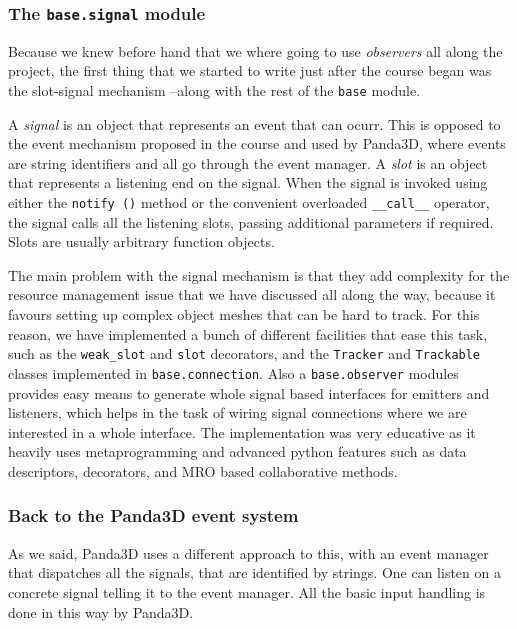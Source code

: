 \documentclass[a4paper,10pt]{article}
\begin{document}
\subsubsection{The \texttt{base.signal} module}

Because we knew before hand that we where going to use
\emph{observers} all along the project, the first thing that we
started to write just after the course began was the slot-signal
mechanism --along with the rest of the \texttt{base} module.

A \emph{signal} is an object that represents an event that can
ocurr. This is opposed to the event mechanism proposed in the course
and used by Panda3D, where events are string identifiers and all go
through the event manager. A \emph{slot} is an object that represents
a listening end on the signal. When the signal is invoked using either
the \texttt{notify ()} method or the convenient overloaded
\texttt{\_\_call\_\_} operator, the signal calls all the listening
slots, passing additional parameters if required. Slots are usually
arbitrary function objects.

The main problem with the signal mechanism is that they add complexity
for the resource management issue that we have discussed all along the
way, because it favours setting up complex object meshes that can be
hard to track. For this reason, we have implemented a bunch of
different facilities that ease this task, such as the
\texttt{weak\_slot} and \texttt{slot} decorators, and the
\texttt{Tracker} and \texttt{Trackable} classes implemented in
\texttt{base.connection}. Also a \texttt{base.observer} modules
provides easy means to generate whole signal based interfaces for
emitters and listeners, which helps in the task of wiring signal
connections where we are interested in a whole interface. The
implementation was very educative as it heavily uses
metaprogramming and advanced python features such as data descriptors,
decorators, and MRO based collaborative methods.

\subsubsection{Back to the Panda3D event system}

As we said, Panda3D uses a different approach to this, with an event
manager that dispatches all the signals, that are identified by
strings. One can listen on a concrete signal telling it to the event
manager. All the basic input handling is done in this way by Panda3D.
\end{document}
